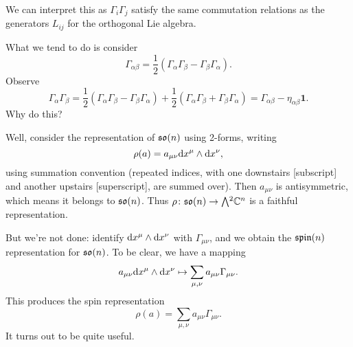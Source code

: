 \begin{remark}
We can interpret this as $\Gamma_{i}\Gamma_{j}$ satisfy the same commutation
relations as the generators $L_{ij}$ for the orthogonal Lie algebra.
\end{remark}

\M
What we tend to do is consider
\begin{equation}
\Gamma_{\alpha\beta} = \frac{1}{2}(\Gamma_{\alpha}\Gamma_{\beta} - \Gamma_{\beta}\Gamma_{\alpha}).
\end{equation}
Observe
\begin{equation}
\Gamma_{\alpha}\Gamma_{\beta} = \frac{1}{2}(\Gamma_{\alpha}\Gamma_{\beta} -
\Gamma_{\beta}\Gamma_{\alpha}) + \frac{1}{2}(\Gamma_{\alpha}\Gamma_{\beta} + \Gamma_{\beta}\Gamma_{\alpha})
= \Gamma_{\alpha\beta} - \eta_{\alpha\beta}\mathbf{1}.
\end{equation}
Why do this?

Well, consider the representation of $\mathfrak{so}(n)$ using 2-forms, writing
\begin{equation}
\rho(a) = a_{\mu\nu}\mathrm{d} x^{\mu}\wedge\mathrm{d} x^{\nu},
\end{equation}
using summation convention (repeated indices, with one downstairs
[subscript] and another upstairs [superscript], are summed over). Then
$a_{\mu\nu}$ is antisymmetric, which means it belongs to $\mathfrak{so}(n)$. Thus
$\rho\colon\so(n)\to\Exterior^{2}\CC^{n}$ is a faithful representation.

But we're not done: identify $\mathrm{d} x^{\mu}\wedge\mathrm{d} x^{\nu}$ with
$\Gamma_{\mu\nu}$, and we obtain the $\operatorname{\mathfrak{spin}}(n)$ representation for $\mathfrak{so}(n)$.
To be clear, we have a mapping
\begin{equation}
a_{\mu\nu}\mathrm{d} x^{\mu}\wedge\mathrm{d} x^{\nu}\mapsto\sum_{\mu,\nu}a_{\mu\nu}\Gamma_{\mu\nu}.
\end{equation}
This produces the spin representation
\begin{equation}
\rho(a) = \sum_{\mu,\nu}a_{\mu\nu}\Gamma_{\mu\nu}.
\end{equation}
It turns out to be quite useful.

